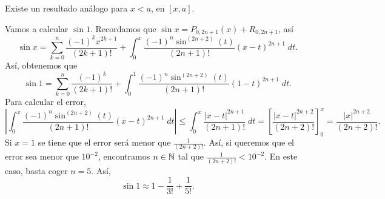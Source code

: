 \begin{observation}
	\normalfont Existe un resultado análogo para $\displaystyle x < a $, en $\displaystyle \left[x,a\right]  $.
\end{observation}
\begin{eg}
\normalfont Vamos a calcular $\displaystyle \sin 1 $. Recordamos que $\displaystyle \sin x = P_{0,2n+1}\left(x\right) + R_{0,2n+1} $, así
\[\sin x = \sum^{n}_{k=0}\frac{\left(-1\right)^{k}x^{2k+1}}{\left(2k+1\right)!}+\int^{x}_{0} \frac{\left(-1\right)^{n}\sin ^{\left(2n+2\right)}\left(t\right)}{\left(2n+1\right)!}\left(x-t\right)^{2n+1} \; dt .\]
Así, obtenemos que
\[\sin 1 = \sum^{n}_{k=0}\frac{\left(-1\right)^{k}}{\left(2k+1\right)!} + \int^{1}_{0} \frac{\left(-1\right)^{n}\sin ^{\left(2n+2\right)}\left(t\right)}{\left(2n+1\right)!}\left(1-t\right)^{2n+1} \; dt.\]
Para calcular el error,
\[ \left|\int^{x}_{0} \frac{\left(-1\right)^{n}\sin ^{\left(2n+2\right)}\left(t\right)}{\left(2n+1\right)!}\left(x-t\right)^{2n+1} \; dt \right| \leq \int^{x}_{0} \frac{ \left|x-t\right|^{2n+1}}{\left(2n+1\right)!} \; dt  = \left[\frac{ \left|x-t\right|^{2n+2}}{\left(2n+2\right)!}\right] ^{x}_{0}= \frac{ \left|x\right|^{2n+2}}{\left(2n+2\right)!} .\]
Si $\displaystyle x = 1 $ se tiene que el error será menor que $\displaystyle \frac{1}{\left(2n+2\right)!} $. Así, si queremos que el error sea menor que $\displaystyle 10^{-2} $, encontramos $\displaystyle n \in \mathbb{N}$ tal que $\displaystyle \frac{1}{\left(2n+2\right)!} < 10^{-2} $. En este caso, basta coger $\displaystyle n=5 $. Así,
\[\sin 1 \approx 1 - \frac{1}{3!} + \frac{1}{5!} .\]
\end{eg}

